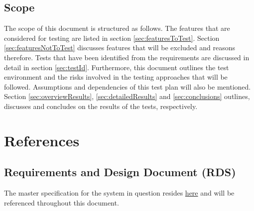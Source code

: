 \subsection{Scope}
The scope of this document is structured as follows. The features that are considered 
for testing are listed in section \ref{sec:featuresToTest}. Section \ref{sec:featuresNotToTest} 
discusses features that will be excluded and reasons therefore. Tests that have been identified 
from the requirements are discussed in detail in section \ref{sec:testId}. Furthermore, this 
document outlines the test environment and the risks involved in the testing approaches that 
will be followed. Assumptions and dependencies of this test plan will also be mentioned. 
Section \ref{sec:overviewResults}, \ref{sec:detailedResults} and \ref{sec:conclusions} 
outlines, discusses and concludes on the results of the tests, respectively.

\section{References} \label{sec:references}
\subsection{Requirements and Design Document (RDS)}
\hypersetup{
	linkcolor = blue
}
The master specification for the system in question resides 
\href{https://clickup.up.ac.za/bbcswebdav/pid-791422-dt-content-rid-8256558_1/xid-8256558_1}{here} 
and will be referenced throughout this document.
\hypersetup{
	linkcolor = black
}
